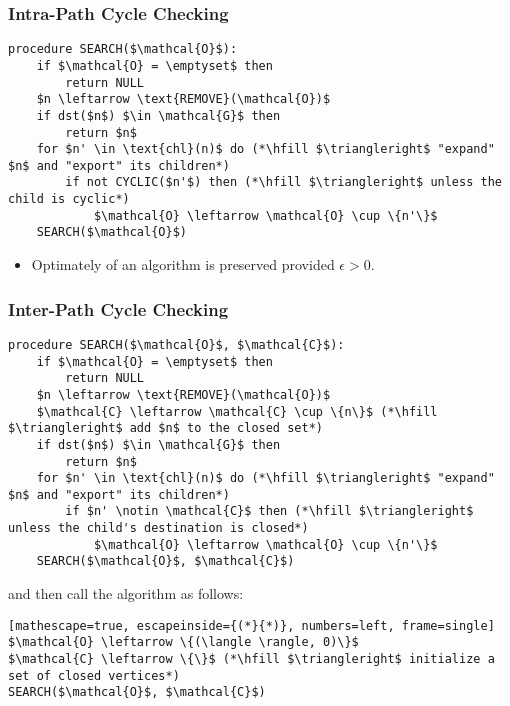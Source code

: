 \subsubsection{Intra-Path Cycle Checking}
\begin{algo}
\begin{lstlisting}
procedure SEARCH($\mathcal{O}$):
    if $\mathcal{O} = \emptyset$ then
        return NULL
    $n \leftarrow \text{REMOVE}(\mathcal{O})$
    if dst($n$) $\in \mathcal{G}$ then
        return $n$
    for $n' \in \text{chl}(n)$ do (*\hfill $\triangleright$ "expand" $n$ and "export" its children*)
        if not CYCLIC($n'$) then (*\hfill $\triangleright$ unless the child is cyclic*)
            $\mathcal{O} \leftarrow \mathcal{O} \cup \{n'\}$
    SEARCH($\mathcal{O}$)
\end{lstlisting}
\begin{itemize}
    \item Optimately of an algorithm is preserved provided $\epsilon>0$.
\end{itemize}
\end{algo}

\subsubsection{Inter-Path Cycle Checking}
\begin{algo}
\begin{lstlisting}
procedure SEARCH($\mathcal{O}$, $\mathcal{C}$):
    if $\mathcal{O} = \emptyset$ then
        return NULL
    $n \leftarrow \text{REMOVE}(\mathcal{O})$
    $\mathcal{C} \leftarrow \mathcal{C} \cup \{n\}$ (*\hfill $\triangleright$ add $n$ to the closed set*)
    if dst($n$) $\in \mathcal{G}$ then
        return $n$
    for $n' \in \text{chl}(n)$ do (*\hfill $\triangleright$ "expand" $n$ and "export" its children*)
        if $n' \notin \mathcal{C}$ then (*\hfill $\triangleright$ unless the child's destination is closed*)
            $\mathcal{O} \leftarrow \mathcal{O} \cup \{n'\}$
    SEARCH($\mathcal{O}$, $\mathcal{C}$)
\end{lstlisting}

and then call the algorithm as follows:

\begin{lstlisting}[mathescape=true, escapeinside={(*}{*)}, numbers=left, frame=single]
$\mathcal{O} \leftarrow \{(\langle \rangle, 0)\}$
$\mathcal{C} \leftarrow \{\}$ (*\hfill $\triangleright$ initialize a set of closed vertices*)
SEARCH($\mathcal{O}$, $\mathcal{C}$)
\end{lstlisting}

\end{algo}
\newpage

